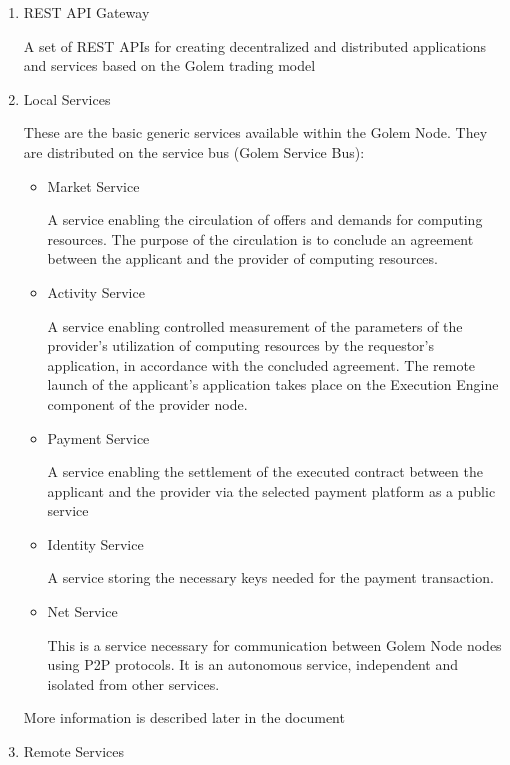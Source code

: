 \begin{enumerate}

\item REST API Gateway

A set of REST APIs for creating decentralized and distributed applications and services 
based on the Golem trading model

\item Local Services

These are the basic generic services available within the Golem Node.
They are distributed on the service bus (Golem Service Bus):

\begin{itemize}

\item Market Service

A service enabling the circulation of offers and demands for computing resources.
The purpose of the circulation is to conclude an agreement between the applicant and 
the provider of computing resources.

\item Activity Service

A service enabling controlled measurement of the parameters of the provider's utilization of computing resources by the requestor's application,
in accordance with the concluded agreement. The remote launch of the applicant's application takes place on the Execution Engine component of the provider node.

\item Payment Service

A service enabling the settlement of the executed contract between the applicant and the provider
via the selected payment platform as a public service

\item Identity Service

A service storing the necessary keys needed for the payment transaction.

\item Net Service

This is a service necessary for communication between Golem Node nodes using P2P protocols.
It is an autonomous service, independent and isolated from other services.

\end{itemize}

More information is described later in the document

\item Remote Services


\end{enumerate}
